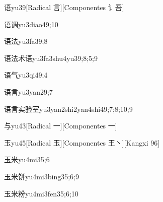 \begin{verbete}{语}{yu3}{9}[Radical 言][Componentes 讠吾]
\end{verbete}

\begin{verbete}{语调}{yu3diao4}{9;10}
\end{verbete}

\begin{verbete}{语法}{yu3fa3}{9;8}
\end{verbete}

\begin{verbete}{语法术语}{yu3fa3shu4yu3}{9;8;5;9}
\end{verbete}

\begin{verbete}{语气}{yu3qi4}{9;4}
\end{verbete}

\begin{verbete}{语言}{yu3yan2}{9;7}
\end{verbete}

\begin{verbete}{语言实验室}{yu3yan2shi2yan4shi4}{9;7;8;10;9}
\end{verbete}

\begin{verbete}{与}{yu4}{3}[Radical 一][Componentes 一]
\end{verbete}

\begin{verbete}{玉}{yu4}{5}[Radical 玉][Componentes 王丶][Kangxi 96]
\end{verbete}

\begin{verbete}{玉米}{yu4mi3}{5;6}
\end{verbete}

\begin{verbete}{玉米饼}{yu4mi3bing3}{5;6;9}
\end{verbete}

\begin{verbete}{玉米粉}{yu4mi3fen3}{5;6;10}
\end{verbete}

